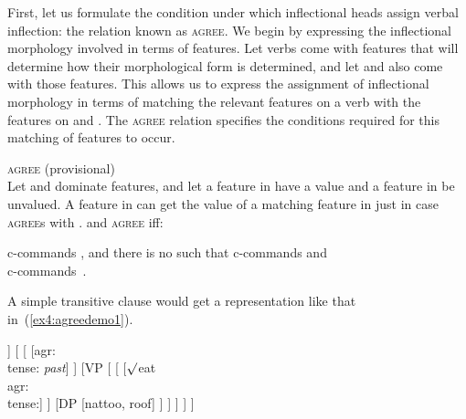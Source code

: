 First, let us formulate the condition under which inflectional heads assign verbal inflection: the relation known as \textsc{agree}. We begin by expressing the inflectional morphology involved in terms of features. Let verbs come with features that will determine how their morphological form is determined, and let  and  also come with those features. This allows us to express the assignment of inflectional morphology in terms of matching the relevant features on a verb with the features on  and . The \textsc{agree} relation specifies the conditions required for this matching of features to occur.\enlargethispage*{\baselineskip}%
%
%
%
\begin{exe}
\ex \label{ex4:agree} \textsc{agree} (provisional)\\
Let  and  dominate features, and let a feature in  have a value and a feature in  be unvalued. A feature in  can get the value of a matching feature in  just in case  \textsc{agree}s with .  and  \textsc{agree} iff:
\begin{xlist}
	\ex {} c-commands , and
	\ex there is no  such that  c-commands  and \\ c-commands~.
\end{xlist}
\end{exe}
A simple transitive clause would get a representation like that in~(\ref{ex4:agreedemo1}).
\begin{exe}
\ex \label{ex4:agreedemo1}%
%
%
%
\small
\begin{forest}
[TP
	[DP [they, roof]]
	[ 
		[ [agr: \emph{}\\ tense: \emph{past}] ]
		[VP [
			[ [$\surd$eat\\ agr:\\ tense:] ]
			[DP [nattoo, roof] ]
		] ]
	]
]
\end{forest}
\end{exe}
